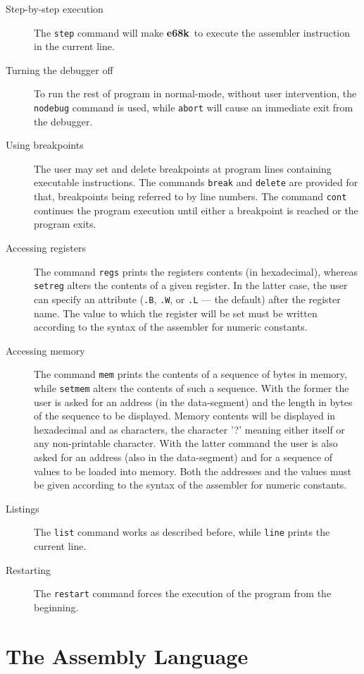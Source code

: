 \documentclass[a4,11pt]{article}
\newcommand{\esek}{{\bf e68k}}
\newcommand{\comm}[1]{{\tt #1}}
\begin{document}
\begin{description}
\item[Step-by-step execution] The \comm{step} command will make \esek\    to
execute the assembler instruction in the current line.
\item[Turning the debugger off] To run the rest of program in normal-mode,
without user intervention, the \comm{nodebug} command is used,
while \comm{abort} will cause an immediate exit from the debugger.
\item[Using breakpoints] The user may set and delete breakpoints at
program lines containing executable instructions. The commands
\comm{break} and \comm{delete} are provided for that, breakpoints
being referred to by line numbers. The command \comm{cont}
continues the program execution until either a breakpoint is reached
or the program exits.
\item[Accessing registers] The command \comm{regs} prints the 
registers contents (in hexadecimal), whereas
\comm{setreg}  alters the contents of a
given register. In the latter case,  the user can specify an attribute 
(\comm{.B}, \comm{.W}, or \comm{.L} --- the default) after the
register name. The
value to which the register will be set must be written according to the
syntax of the assembler for numeric constants.
\item[Accessing memory] The command \comm{mem}
prints the contents of a sequence of bytes in
memory, while \comm{setmem} alters the contents
of such a sequence. With the former the user is asked for
an address (in the data-segment) and the length in bytes of the
sequence to be displayed. Memory contents will be displayed
in hexadecimal and as characters, the character '?' meaning either
itself or any non-printable character.
With the latter command the user is also asked for an address
(also in the data-segment) and for a sequence of values to be
loaded into memory. Both the addresses and the values must be given
according to the syntax of the assembler for numeric constants.
\item[Listings] The \comm{list} command works as described before, while
\comm{line} prints the current line.
\item[Restarting] The \comm{restart} command forces the execution of
the program from the beginning.
\end{description}

\section{The Assembly Language}
\end{document}
